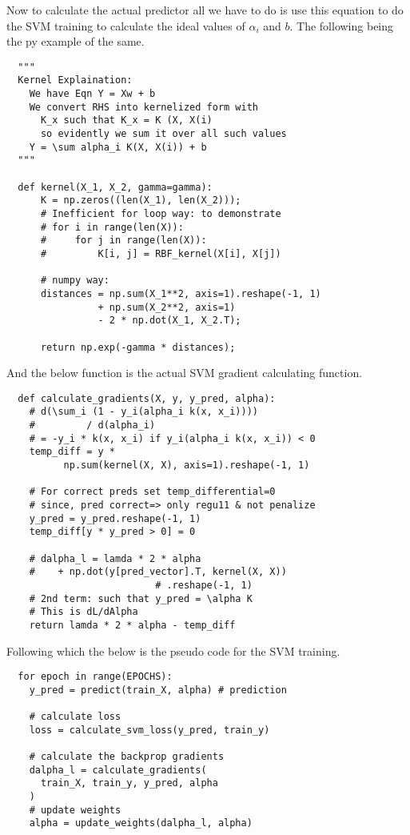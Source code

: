 \documentclass[hidelinks]{book}
\numberwithin{equation}{section}
\begin{document}
  Now to calculate the actual predictor all we have to do is use this equation
  to do the SVM training to calculate the ideal values of $\alpha_i$ and $b$.
  The following being the py example of the same.
  \begin{verbatim}
  """
  Kernel Explaination:
    We have Eqn Y = Xw + b
    We convert RHS into kernelized form with
      K_x such that K_x = K (X, X(i)
      so evidently we sum it over all such values
    Y = \sum alpha_i K(X, X(i)) + b
  """

  def kernel(X_1, X_2, gamma=gamma):
      K = np.zeros((len(X_1), len(X_2)));
      # Inefficient for loop way: to demonstrate
      # for i in range(len(X)):
      #     for j in range(len(X)):
      #         K[i, j] = RBF_kernel(X[i], X[j])

      # numpy way:
      distances = np.sum(X_1**2, axis=1).reshape(-1, 1)
                + np.sum(X_2**2, axis=1)
                - 2 * np.dot(X_1, X_2.T);

      return np.exp(-gamma * distances);
  \end{verbatim}

  And the below function is the actual SVM gradient calculating function.
  \begin{verbatim}
  def calculate_gradients(X, y, y_pred, alpha):
    # d(\sum_i (1 - y_i(alpha_i k(x, x_i))))
    #         / d(alpha_i)
    # = -y_i * k(x, x_i) if y_i(alpha_i k(x, x_i)) < 0
    temp_diff = y *
          np.sum(kernel(X, X), axis=1).reshape(-1, 1)

    # For correct preds set temp_differential=0
    # since, pred correct=> only regu11 & not penalize
    y_pred = y_pred.reshape(-1, 1)
    temp_diff[y * y_pred > 0] = 0

    # dalpha_l = lamda * 2 * alpha
    #    + np.dot(y[pred_vector].T, kernel(X, X))
                          # .reshape(-1, 1)
    # 2nd term: such that y_pred = \alpha K
    # This is dL/dAlpha
    return lamda * 2 * alpha - temp_diff
  \end{verbatim}

  Following which the below is the pseudo code for the SVM training.
  \begin{verbatim}
  for epoch in range(EPOCHS):
    y_pred = predict(train_X, alpha) # prediction

    # calculate loss
    loss = calculate_svm_loss(y_pred, train_y)

    # calculate the backprop gradients
    dalpha_l = calculate_gradients(
      train_X, train_y, y_pred, alpha
    )
    # update weights
    alpha = update_weights(dalpha_l, alpha)
  \end{verbatim}
\end{document}

